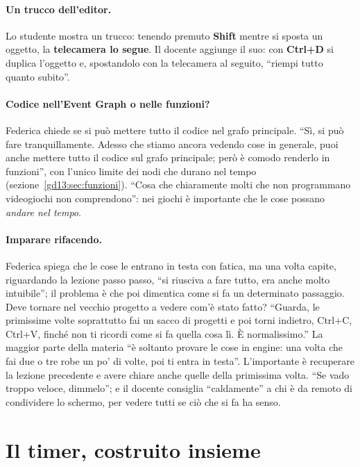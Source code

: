\paragraph{Un trucco dell'editor.} Lo studente mostra un trucco: tenendo premuto
\textbf{Shift} mentre si sposta un oggetto, la \textbf{telecamera lo segue}. Il
docente aggiunge il suo: con \textbf{Ctrl+D} si duplica l'oggetto e, spostandolo
con la telecamera al seguito, ``riempi tutto quanto subito''.

\paragraph{Codice nell'Event Graph o nelle funzioni?} Federica chiede se si può
mettere tutto il codice nel grafo principale. ``Sì, si può fare tranquillamente.
Adesso che stiamo ancora vedendo cose in generale, puoi anche mettere tutto il
codice sul grafo principale; però è comodo renderlo in funzioni'', con l'unico
limite dei nodi che durano nel tempo (sezione~\ref{gd13:sec:funzioni}).
``Cosa che chiaramente molti che non programmano videogiochi non comprendono'':
nei giochi è importante che le cose possano \emph{andare nel tempo}.

\paragraph{Imparare rifacendo.} Federica spiega che le cose le entrano in testa
con fatica, ma una volta capite, riguardando la lezione passo passo, ``si riusciva
a fare tutto, era anche molto intuibile''; il problema è che poi dimentica come
si fa un determinato passaggio. Deve tornare nel vecchio progetto a vedere com'è
stato fatto? ``Guarda, le primissime volte soprattutto fai un sacco di progetti e
poi torni indietro, Ctrl+C, Ctrl+V, finché non ti ricordi come si fa quella cosa
lì. È normalissimo.'' La maggior parte della materia ``è soltanto provare le cose
in engine: una volta che fai due o tre robe un po' di volte, poi ti entra in
testa''. L'importante è recuperare la lezione precedente e avere chiare anche
quelle della primissima volta. ``Se vado troppo veloce, dimmelo''; e il docente
consiglia ``caldamente'' a chi è da remoto di condividere lo schermo, per vedere
tutti se ciò che si fa ha senso.

\section{Il timer, costruito insieme}
\label{gd13:sec:timer}

